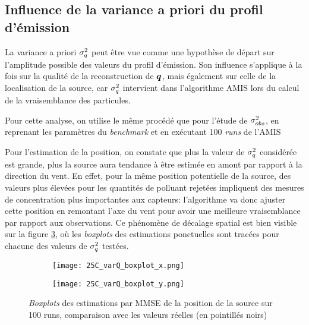   	


\subsection{Influence de la variance a priori du profil d'émission}

La variance a priori $\sigma_q^2$ peut être vue comme une hypothèse de départ sur l'amplitude possible des valeurs du profil d'émission. Son influence s'applique à la fois sur la qualité de la reconstruction de ${\bm{q}}$, mais également sur celle de la localisation de la source, car $\sigma_q^2$ intervient dans l'algorithme AMIS lors du calcul de la vraisemblance des particules. 

Pour cette analyse, on utilise le même procédé que pour l'étude de ${\sigma_{obs}^2}$, en reprenant les paramètres du \textit{benchmark} et en exécutant 100 \textit{runs} de l'AMIS 

Pour l'estimation de la position, on constate que plus la valeur de $\sigma_q^2$ considérée est grande, plus la source aura tendance à être estimée en amont  par rapport à la direction du vent. En effet, pour la même position potentielle de la source, des valeurs plus élevées pour les quantités de polluant rejetées impliquent des mesures de concentration plus importantes aux capteurs: l'algorithme va donc ajuster cette position en remontant l'axe du vent pour avoir une meilleure vraisemblance par rapport aux observations. Ce phénomène de décalage spatial est bien visible sur la figure \ref{fig_25C_varQ_boxplots}, où les \textit{boxplots} des estimations ponctuelles sont tracées pour chacune des valeurs de $\sigma_q^2$ testées.

\begin{figure}[h!]
	\centering
         	\begin{subfigure}[t]{0.5\textwidth}
         		\centering
         		\texttt{[image: 25C\_varQ\_boxplot\_x.png]}
         		\caption{}
         		\label{varQ_boxplot_x}
         	\end{subfigure}%
         \begin{subfigure}[t]{0.5\textwidth}
         	\centering
         	\texttt{[image: 25C\_varQ\_boxplot\_y.png]}
         	\caption{}
         	\label{varQ_boxplot_y}
         \end{subfigure}%
         \caption{\textit{Boxplots} des estimations par MMSE de la position de la source sur 100 runs, comparaison avec les valeurs réelles (en pointillés noirs)}
         \label{fig_25C_varQ_boxplots}
	
\end{figure}

